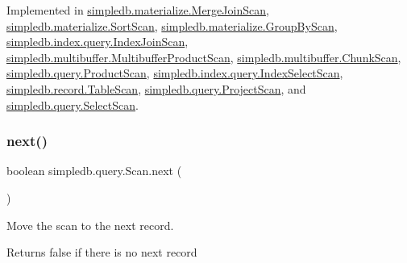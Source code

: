 Implemented in \hyperlink{classsimpledb_1_1materialize_1_1MergeJoinScan_a1450a0e4f554e53c628ed66d39020fc6}{simpledb.\+materialize.\+Merge\+Join\+Scan}, \hyperlink{classsimpledb_1_1materialize_1_1SortScan_a9987dac3483863a86dd3a97495a1f522}{simpledb.\+materialize.\+Sort\+Scan}, \hyperlink{classsimpledb_1_1materialize_1_1GroupByScan_aeff4514ccf6106445de717b20ec3d155}{simpledb.\+materialize.\+Group\+By\+Scan}, \hyperlink{classsimpledb_1_1index_1_1query_1_1IndexJoinScan_a2079804951f64581efd8cc1ef6af297b}{simpledb.\+index.\+query.\+Index\+Join\+Scan}, \hyperlink{classsimpledb_1_1multibuffer_1_1MultibufferProductScan_afc843ca9e632e75d171245fe59e2bd14}{simpledb.\+multibuffer.\+Multibuffer\+Product\+Scan}, \hyperlink{classsimpledb_1_1multibuffer_1_1ChunkScan_ab63331aac633c7b12a5aa0401a77d2b2}{simpledb.\+multibuffer.\+Chunk\+Scan}, \hyperlink{classsimpledb_1_1query_1_1ProductScan_a06c138c93e98cede58b6421c93aa451d}{simpledb.\+query.\+Product\+Scan}, \hyperlink{classsimpledb_1_1index_1_1query_1_1IndexSelectScan_a5ab76aa38dcde3d563d88753c9c171ce}{simpledb.\+index.\+query.\+Index\+Select\+Scan}, \hyperlink{classsimpledb_1_1record_1_1TableScan_aad90f69cc2d14ecfe8a7854e8ed60548}{simpledb.\+record.\+Table\+Scan}, \hyperlink{classsimpledb_1_1query_1_1ProjectScan_aff65421fc21f24723e730cb1d26fa6ed}{simpledb.\+query.\+Project\+Scan}, and \hyperlink{classsimpledb_1_1query_1_1SelectScan_ab96fcae15d9b956cddd234ae1cbe84e7}{simpledb.\+query.\+Select\+Scan}.

\mbox{\label{interfacesimpledb_1_1query_1_1Scan_a5fc77b7c76d91f89f6c09ac4f15ef351}} 
\subsubsection{\texorpdfstring{next()}{next()}}
{\footnotesize\ttfamily boolean simpledb.\+query.\+Scan.\+next (\begin{DoxyParamCaption}{ }\end{DoxyParamCaption})}

Move the scan to the next record. \begin{DoxyReturn}{Returns}
false if there is no next record 
\end{DoxyReturn}



